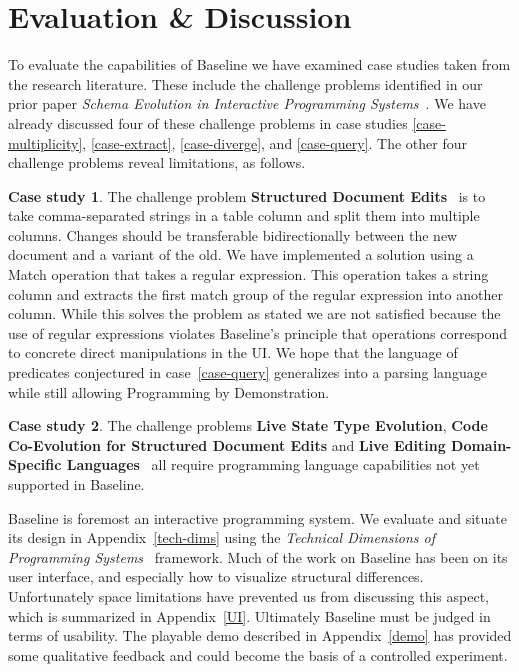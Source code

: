 \documentclass[english,submission]{programming}
\theoremstyle{definition}
\newtheorem{casestudy}{Case study}
\begin{document}
\section{Evaluation \& Discussion}\label{discussion}

To evaluate the capabilities of Baseline we have examined case studies taken from the research literature. These include the challenge problems identified in our prior paper
\textit{Schema Evolution in Interactive Programming Systems}~\cite{challenge-problems}. We have already discussed four of these challenge problems in case studies \ref{case-multiplicity}, \ref{case-extract}, \ref{case-diverge}, and \ref{case-query}. The other four challenge problems reveal limitations, as follows.

\begin{casestudy}
The challenge problem \textbf{Structured Document Edits}~\cite{challenge-problems} is to
take comma-separated strings in a table column and split them into multiple columns. Changes should be transferable bidirectionally between the new document and a variant of the old. We have implemented a solution using a \textsf{Match} operation that takes a regular expression. This operation takes a string column and extracts the first match group of the regular expression into another column. While this solves the problem as stated we are not satisfied because the use of regular expressions violates Baseline's principle that operations correspond to concrete direct manipulations in the UI. We hope that the language of predicates conjectured in case~\ref{case-query} generalizes into a parsing language while still allowing Programming by Demonstration.
\end{casestudy}

\begin{casestudy}
The challenge problems \textbf{Live State Type Evolution}, \textbf{Code Co-Evolution for Structured Document Edits} and
\textbf{Live Editing Domain-Specific Languages}~\cite{challenge-problems} all require programming language capabilities not yet supported in Baseline.
\end{casestudy}


Baseline is foremost an interactive programming system.
We evaluate and situate its design in Appendix~\ref{tech-dims} using the \textit{Technical Dimensions of Programming Systems}~\cite{techdims} framework.
Much of the work on Baseline has been on its user interface, and especially how to visualize structural differences. Unfortunately space limitations have prevented us from discussing this aspect, which is summarized in Appendix~\ref{UI}.
Ultimately Baseline must be judged in terms of usability.
The playable demo described in Appendix~\ref{demo} has provided some qualitative feedback and could become the basis of a controlled experiment.
\end{document}

